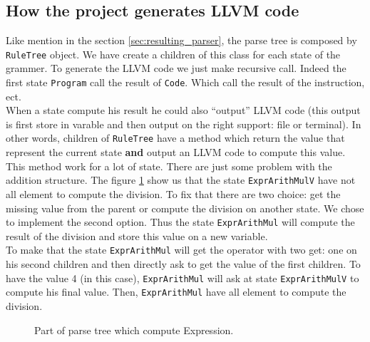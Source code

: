 \documentclass[a4paper,11pt]{article}
\begin{document}
  \subsection{How the project generates LLVM code}
    Like mention in the section \ref{sec:resulting_parser}, the parse tree is composed by \verb|RuleTree| object. We have create a children of this class for each state of the grammer. To generate the LLVM code we just make recursive call. Indeed the first state \verb|Program| call the result of \verb|Code|.  Which call the result of the instruction, ect.\\
    When a state compute his result he could also ``output'' LLVM code (this output is first store in varable and then output on the right support: file or terminal). In other words, children of \verb|RuleTree| have a method which return the value that represent the current state \textbf{and} output an LLVM code to compute this value.\\
    This method work for a lot of state. There are just some problem with the addition structure. The figure \ref{fig:addition_states} show us that the state \verb|ExprArithMulV| have not all element to compute the division. To fix that there are two choice: get the missing value from the parent or compute the division on another state. We chose to implement the second option.  Thus the state \verb|ExprArithMul| will compute the result of the division and store this value on a new variable.\\
    To make that the state \verb|ExprArithMul| will get the operator with two get: one on his second children and then directly ask to get the value of the first children. To have the value 4 (in this case), \verb|ExprArithMul| will ask at state \verb|ExprArithMulV| to compute his final value.  Then, \verb|ExprArithMul| have all element to compute the division.
    
    \begin{figure}[h!]
      \centering
      \caption{Part of parse tree which compute Expression.}
      \label{fig:addition_states}
    \end{figure}
    
\end{document}

